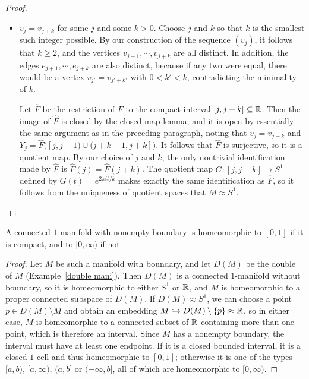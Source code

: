 \begin{proof}
\begin{itemize}
\item $v_j=v_{j+k}$ for some $j$ and some $k>0$. Choose $j$ and $k$ so that $k$ is the smallest such integer possible. By our construction of the sequence $(v_j)$, it follows that $k\geq2$, and the vertices $v_{j+1},\cdots,v_{j+k}$ are all distinct. In addition, the edges $e_{j+1},\cdots,e_{j+k}$ are also distinct, because if any two were equal, there would be a vertex $v_{j'}=v_{j'+k'}$ with $0<k'<k$, contradicting the minimality of $k$.\par
Let $\widehat{F}$ be the restriction of $F$ to the compact interval $[j,j+k]\subseteq\mathbb{R}$. Then the image of $\widehat{F}$ is closed by the closed map lemma, and it is open by essentially the same argument as in the preceding paragraph, noting that $v_j=v_{j+k}$ and $Y_j=\widehat{F}\big([j,j+1)\cup(j+k-1,j+k]\big)$. It follows that $\widehat{F}$ is surjective, so it is a quotient map. By our choice of $j$ and $k$, the only nontrivial identification made by $\widehat{F}$ is $\widehat{F}(j)=\widehat{F}(j+k)$. The quotient map $G:[j,j+k]\to S^1$ defined by $G(t)=e^{2\pi it/k}$ makes exactly the same identification as $\widehat{F}$, so it follows from the uniqueness of quotient spaces that $M\approx S^1$.
\end{itemize}
\end{proof}
\begin{corollary}\label{class one mani boundary}
A connected $1$-manifold with nonempty boundary is homeomorphic to $[0,1]$ if it is compact, and to $[0,\infty)$ if not.
\end{corollary}
\begin{proof}
Let $M$ be such a manifold with boundary, and let $D(M)$ be the double of $M$ (Example~\ref{double mani}). Then $D(M)$ is a connected $1$-manifold without boundary, so it is homeomorphic to either $S^1$ or $\mathbb{R}$, and $M$ is homeomorphic
to a proper connected subspace of $D(M)$. If $D(M)\approx S^1$, we can choose a point $p\in D(M)\setminus M$ and obtain an embedding $M\hookrightarrow D(M)\setminus\{p\}\approx\mathbb{R}$, so in either case, $M$ is homeomorphic to a connected subset of $\mathbb{R}$ containing more than one point, which is therefore an interval. Since $M$ has a nonempty boundary, the interval must have at least one endpoint. If it is a closed bounded interval, it is a closed $1$-cell and thus homeomorphic to $[0,1]$; otherwise it is one of the types $[a,b)$, $[a,\infty)$, $(a,b]$ or $(-\infty,b]$, all of which are homeomorphic to $[0,\infty)$.
\end{proof}
